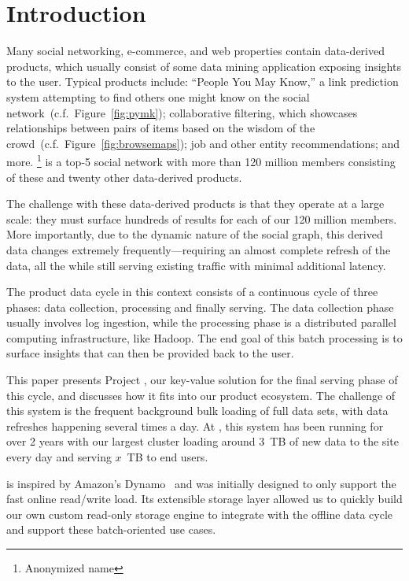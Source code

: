 \section{Introduction}
\label{sec:introduction}

Many social networking, e-commerce, and web properties contain
data-derived products, which usually consist of some data mining
application exposing insights to the user. Typical products include:
``People You May Know,'' a link prediction system attempting to find
others one might know on the social
network~(c.f.~Figure~\ref{fig:pymk}); collaborative filtering, which
showcases relationships between pairs of items based on the wisdom of
the crowd~(c.f.~Figure~\ref{fig:browsemaps}); job and other entity
recommendations; and more. \linkedin\footnote{Anonymized name} is a
top-5 social network with more than 120 million members consisting of
these and twenty other data-derived products. 

The challenge with these data-derived products is that they operate at
a large scale: they must surface hundreds of results for each of our
120 million members. More importantly, due to the dynamic nature of
the social graph, this derived data changes extremely
frequently---requiring an almost complete refresh of the data, all the
while still serving existing traffic with minimal additional latency.

The product data cycle in this context consists of a continuous cycle
of three phases: data collection, processing and finally serving. The
data collection phase usually involves log ingestion, while the
processing phase is a distributed parallel computing infrastructure,
like Hadoop. The end goal of this batch processing is to surface
insights that can then be provided back to the user. 

This paper presents Project \projectname{}, our key-value solution for
the final serving phase of this cycle, and discusses how it fits into
our product ecosystem. The challenge of this system is the frequent
background bulk loading of full data sets, with data refreshes
happening several times a day. At \linkedin, this system has been
running for over 2 years with our largest cluster loading around 3~TB
of new data to the site every day and serving $x$~TB to end users. 

\projectname{} is inspired by Amazon's Dynamo~\cite{dynamo} and was
initially designed to only support the fast online read/write load.
Its extensible storage layer allowed us to quickly build our own
custom read-only storage engine to integrate with the offline data
cycle and support these batch-oriented use cases.

